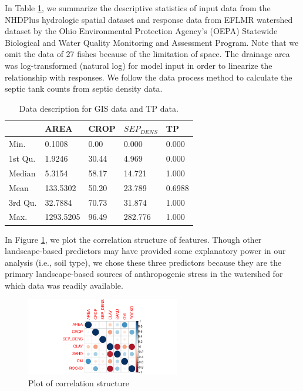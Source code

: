 \documentclass[a4paper]{artikel3}
\begin{document}
In Table \ref{tab: data}, we summarize the descriptive statistics of input data from the NHDPlus hydrologic spatial dataset \cite{moore2019user} and response data from EFLMR watershed dataset by the Ohio Environmental Protection Agency's (OEPA) Statewide Biological and Water Quality Monitoring and Assessment Program. Note that we omit the data of 27 fishes because of the limitation of space. The drainage area was log-transformed (natural log) for model input in order to linearize the relationship with responses. We follow the data process method to calculate the septic tank counts from septic density data.

\label{description}
\begin{table}[H]
\centering
\caption{Data description for GIS data and TP data. }
\begin{tabular}{l l l l l}
    \hline
     &AREA &CROP &$SEP_{DENS}$ & TP\\
    \hline
    Min. & 0.1008 & 0.00 & 0.000 & 0.000 \\
    1st Qu. & 1.9246 & 30.44 & 4.969 & 0.000 \\
    Median & 5.3154 & 58.17 & 14.721 & 1.000 \\
    Mean & 133.5302 & 50.20 & 23.789 & 0.6988 \\
    3rd Qu. & 32.7884 & 70.73 & 31.874 & 1.000 \\
    Max. & 1293.5205 & 96.49 & 282.776 & 1.000 \\
    \hline
\end{tabular}
\label{tab: data}
\end{table}

In Figure \ref{fig: correlation}, we plot the correlation structure of features. Though other landscape-based predictors may have provided some explanatory power in our analysis (i.e., soil
type), we chose these three predictors because they are the primary landscape-based sources of anthropogenic stress in the watershed for which data was readily available.
\begin{figure}[H]
	\centering
	\includegraphics[width=0.6\textwidth]{./figures/corr.pdf}
	\caption{Plot of correlation structure}
	\label{fig: correlation}
\end{figure}
\end{document}
